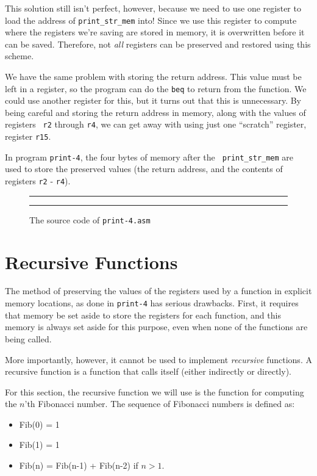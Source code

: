 \documentclass[makeidx,psfig]{article}
\begin{document}
This solution still isn't perfect, however, because we need to use one
register to load the address of {\tt print\_str\_mem} into!  Since we
use this register to compute where the registers we're saving are
stored in memory, it is overwritten before it can be saved. 
Therefore, not {\em all} registers can be preserved and restored using
this scheme.

We have the same problem with storing the return address.  This value
must be left in a register, so the program can do the {\tt beq} to
return from the function.  We could use another register for this, but
it turns out that this is unnecessary.  By being careful and storing
the return address in memory, along with the values of registers {\tt
r2} through {\tt r4}, we can get away with using just one ``scratch''
register, register {\tt r15}.

In program {\tt print-4}, the four bytes of memory after the {\tt
print\_str\_mem} are used to store the preserved values (the return
address, and the contents of registers {\tt r2} - {\tt r4}).

\begin{figure}
\caption{The source code of {\tt print-4.asm}}
\hrule

\hrule
\end{figure}

\section{Recursive Functions}

The method of preserving the values of the registers used by a
function in explicit memory locations, as done in {\tt print-4} has
serious drawbacks.  First, it requires that memory be set aside to
store the registers for each function, and this memory is always set
aside for this purpose, even when none of the functions are being
called.

More importantly, however, it cannot be used to implement {\em
recursive} functions.  A recursive function is a function that calls
itself (either indirectly or directly).

For this section, the recursive function we will use is the function
for computing the $n$'th Fibonacci number.  The sequence of Fibonacci 
numbers is defined as:

\begin{itemize}

	\item	Fib(0) = 1
	\item	Fib(1) = 1
	\item	Fib(n) = Fib(n-1) + Fib(n-2) if $n > 1$.

\end{itemize}
\end{document}
